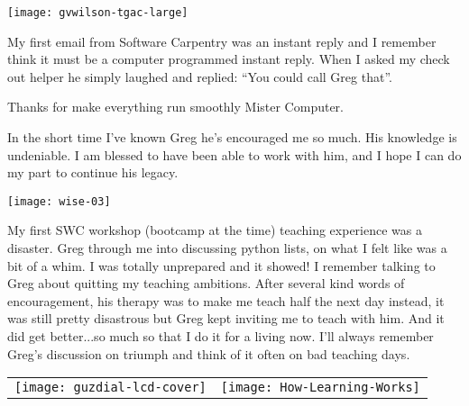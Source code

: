 \newpage

\vspace*{\fill}

\begin{center}
\texttt{[image: gvwilson-tgac-large]}
\end{center}

My first email from Software Carpentry was an instant reply and I remember
think it must be a computer programmed instant reply. When I asked my check out
helper he simply laughed and replied: ``You could call Greg that''. 

Thanks for make everything run smoothly Mister Computer.

\vspace*{\fill}

\newpage

In the short time I've known Greg he's encouraged me so much. His knowledge is
undeniable. I am blessed to have been able to work with him, and I hope I can
do my part to continue his legacy.


\newpage

\begin{center}
\texttt{[image: wise-03]}
\end{center}

My first SWC workshop (bootcamp at the time) teaching experience was a
disaster.  Greg through me into discussing python lists, on what I felt like
was a bit of a whim.  I was totally unprepared and it showed!  I remember
talking to Greg about quitting my teaching ambitions.  After several kind words
of encouragement, his therapy was to make me teach half the next day instead,
it was still pretty disastrous but Greg kept inviting me to teach with him.
And it did get better...so much so that I do it for a living now.  I'll always
remember Greg's discussion on triumph and think of it often on bad teaching
days. 


\newpage

\begin{center}
\begin{tabular*}{\textwidth}[t]{ c c }
    \texttt{[image: guzdial-lcd-cover]} &
    \texttt{[image: How-Learning-Works]} \\
\end{tabular*}
\end{center}

